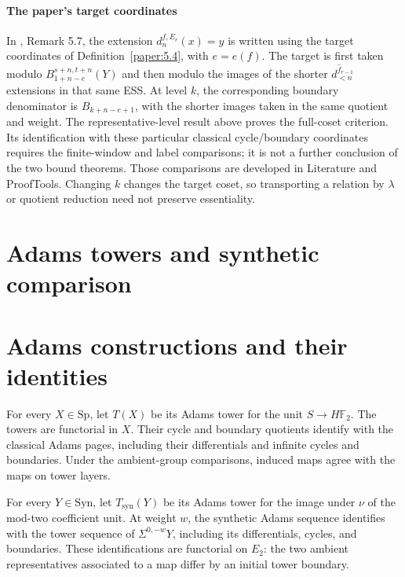 \paragraph*{The paper's target coordinates}
In \cite{LWX126}, Remark 5.7, the extension
$d_n^{f,E_r}(x)=y$ is written using the target coordinates of
Definition~\ref{paper:5.4}, with $e=e(f)$. The target is first taken
modulo $B_{1+n-e}^{s+n,t+n}(Y)$ and then modulo the images of the
shorter $d_{<n}^{\widehat f_{r-1}}$ extensions in that same ESS.
At level $k$, the corresponding boundary denominator is
$B_{k+n-e+1}$, with the shorter images taken in the same quotient and
weight. The representative-level result above proves the full-coset
criterion. Its identification with these particular classical
cycle/boundary coordinates requires the finite-window and label
comparisons; it is not a further conclusion of the two bound theorems.
Those comparisons are developed in Literature and ProofTools.
Changing $k$ changes the target coset, so transporting a relation by
$\lambda$ or quotient reduction need not preserve essentiality.

\section{Adams towers and synthetic comparison}
\section{Adams constructions and their identities}

\begin{definition}
\label{frontier:AdamsSynthetic:14d5e6606bc5}
For every $X\in\mathrm{Sp}$, let $T(X)$ be its Adams tower for the unit $S\to H\mathbb F_2$. The towers are functorial in $X$. Their cycle and boundary quotients identify with the classical Adams pages, including their differentials and infinite cycles and boundaries. Under the ambient-group comparisons, induced maps agree with the maps on tower layers.
\end{definition}

\begin{definition}
\label{frontier:AdamsSynthetic:1b85f123880c}
For every $Y\in\mathrm{Syn}$, let $T_{\mathrm{syn}}(Y)$ be its Adams tower for the image under $\nu$ of the mod-two coefficient unit. At weight $w$, the synthetic Adams sequence identifies with the tower sequence of $\Sigma^{0,-w}Y$, including its differentials, cycles, and boundaries. These identifications are functorial on $E_2$: the two ambient representatives associated to a map differ by an initial tower boundary.
\end{definition}


